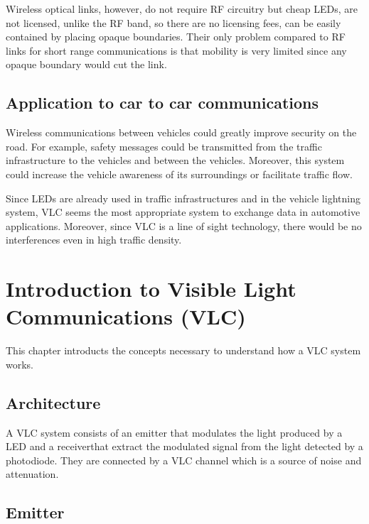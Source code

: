 \documentclass[12pt]{report}
\begin{document}
Wireless optical links, however, do not require RF circuitry but cheap LEDs, are not licensed, unlike the RF band, so there are no licensing fees, can be easily contained by placing opaque boundaries. Their only problem compared to RF links for short range communications is that mobility is very limited since any opaque boundary would cut the link.

\section{Application to car to car communications}

Wireless communications between vehicles could greatly improve security on the road. For example, safety messages could be transmitted from the traffic infrastructure to the vehicles and between the vehicles. Moreover, this system could increase the vehicle awareness of its surroundings or facilitate traffic flow.

Since LEDs are already used in traffic infrastructures and in the vehicle lightning system, VLC seems the most appropriate system to exchange data in automotive applications. Moreover, since VLC is a line of sight technology, there would be no interferences even in high traffic density.

















\chapter{Introduction to Visible Light Communications (VLC)}

This chapter introducts the concepts necessary to understand how a VLC system works.

\section{Architecture}

A VLC system consists of an emitter that modulates the light produced by a LED and a receiverthat extract the modulated signal from the light detected by a photodiode. They are connected by a VLC channel which is a source of noise and attenuation.

\section{Emitter}
\end{document}
